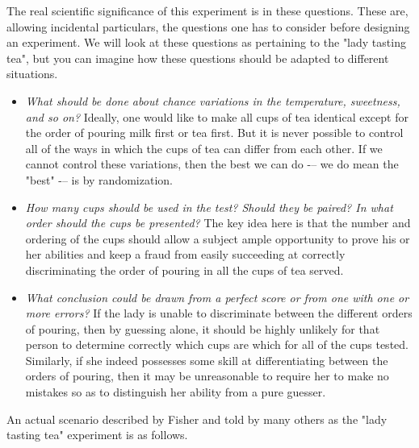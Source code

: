 The real scientific significance of this experiment is in these questions. These are, allowing incidental particulars, the questions one has to consider before designing an experiment. We will look at these questions as pertaining to the "lady tasting tea", but you can imagine how these questions should be adapted to different situations.

\begin{itemize}
  \item \emph{What should be done about chance variations in the temperature, sweetness, and so on?}
    Ideally, one would like to make all cups of tea identical except for the order of pouring milk first or tea first. But it is never possible to control all of the ways in which the cups of tea can differ from each other. If we cannot control these variations, then the best we can do -– we do mean the "best" -– is by randomization.

  \item \emph{How many cups should be used in the test? Should they be paired? In what order should the cups be presented?} The key idea here is that the number and ordering of the cups should allow a subject ample opportunity to prove his or her abilities and keep a fraud from easily succeeding at correctly discriminating the order of pouring in all the cups of tea served.

  \item \emph{What conclusion could be drawn from a perfect score or from one with one or more errors?} If the lady is unable to discriminate between the different orders of pouring, then by guessing alone, it should be highly unlikely for that person to determine correctly which cups are which for all of the cups tested. Similarly, if she indeed possesses some skill at differentiating between the orders of pouring, then it may be unreasonable to require her to make no mistakes so as to distinguish her ability from a pure guesser.

\end{itemize}

An actual scenario described by Fisher and told by many others as the "lady tasting tea" experiment is as follows.

